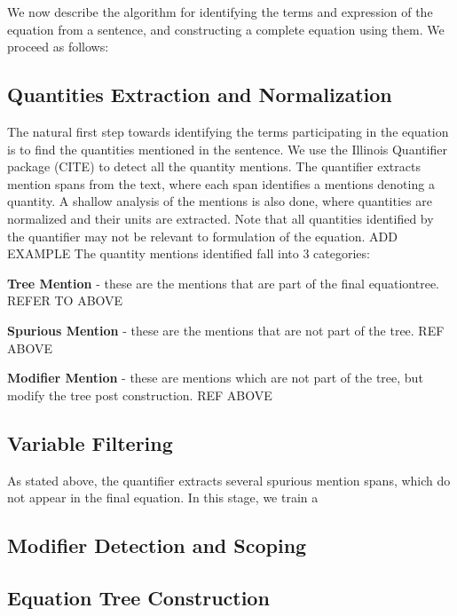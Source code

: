 We now describe the algorithm for identifying the terms and expression of the equation from a sentence, and constructing a complete equation using them. We proceed as follows:
\subsection{Quantities Extraction and Normalization}
The natural first step towards identifying the terms participating in the equation is to find the quantities mentioned in the sentence. We use the Illinois Quantifier package (CITE) to detect all the quantity mentions.
The quantifier extracts mention spans from the text, where each span identifies a mentions denoting a quantity. A shallow analysis of the mentions is also done, where quantities are normalized and their units are extracted. Note that all quantities identified by the quantifier may not be relevant to formulation of the equation. ADD EXAMPLE
The quantity mentions identified fall into 3 categories:
\begin{inparaenum}
\item {\bf Tree Mention} - these are the mentions that are part of the final equationtree. REFER TO ABOVE
\item {\bf Spurious Mention} - these are the mentions that are not part of the tree.
  REF ABOVE
\item {\bf Modifier Mention} - these are mentions which are not part of the tree, but modify the tree post construction. REF ABOVE
\end{inparaenum}

\subsection{Variable Filtering}
As stated above, the quantifier extracts several spurious mention spans, which do not appear in the final equation. In this stage, we train a

\subsection{Modifier Detection and Scoping}
\subsection{Equation Tree Construction}
